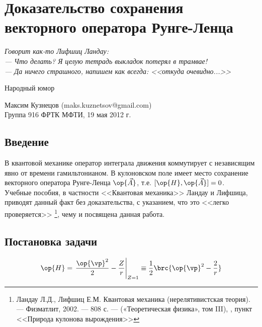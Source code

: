 \chapter{Доказательство сохранения векторного оператора Рунге-Ленца}

\renewcommand{\thesection}{}
\renewcommand{\theequation}{\arabic{section}.\arabic{equation}}


\hfill \begin{minipage}[h]{0.45\textwidth}
\textit{
Говорит как-то Лифшиц Ландау:\\ 
--- Что делать? Я целую тетрадь выкладок потерял в трамвае!\\
--- Да ничего страшного, напишем как всегда: <<откуда очевидно...>>}
\begin{flushright}
Народный юмор
\end{flushright}
\end{minipage}

\noindent
Максим Кузнецов (maks.kuznetsov@gmail.com) \\
Группа 916 ФРТК МФТИ, 19 мая 2012 г.

\section*{Введение}

В квантовой механике оператор интеграла движения коммутирует с независящим явно от времени гамильтонианом. В кулоновском поле имеет место сохранение векторного оператора Рунге-Ленца $\op{\vec{A}}$, т.е. $[\op{H},\op{\vec{A}}] = 0$. \\
Учебные пособия, в частности <<Квантовая механика>> Ландау и Лифшица, приводят данный факт без доказательства, с указанием, что это <<легко проверяется>> \footnote{Ландау Л.Д., Лифшиц Е.М. Квантовая механика (нерелятивистская теория). — Физматлит, 2002. — 808 с. — («Теоретическая физика», том III), , пункт <<Природа кулонова вырождения>>}, чему и посвящена данная работа.


\setcounter{section}{1}
\section*{Постановка задачи}

\begin{equation}
\label{eq:1}
\op{H}=\left. \frac{\op{\vp}^2}{2}-\frac{Z}{r} \right|_{Z=1} \equiv \frac{1}{2} \brc{\op{\vp}^2 - \frac{2}{r}}
\end{equation}

